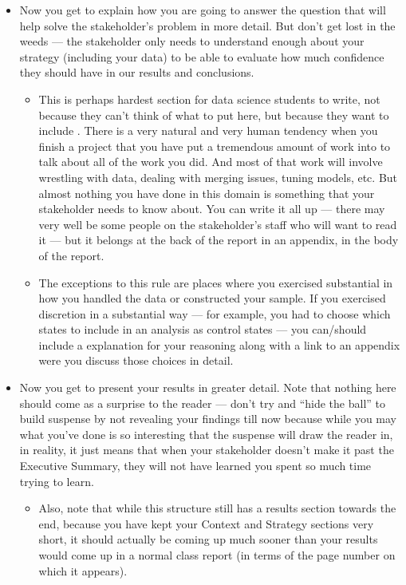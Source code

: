 \documentclass[letterpaper,10pt,english]{jupyterBook}
\begin{document}
\begin{itemize}
\item {} 
\sphinxAtStartPar
{} Now you get to explain how you are going to answer the question that will help solve the stakeholder’s problem in more detail. But don’t get lost in the weeds — the stakeholder only needs to understand enough about your strategy (including your data) to be able to evaluate how much confidence they should have in our results and conclusions.
\begin{itemize}
\item {} 
\sphinxAtStartPar
This is perhaps  hardest section for data science students to write, not because they can’t think of what to put here, but because they want to include . There is a very natural and very human tendency when you finish a project that you have put a tremendous amount of work into to talk about all of the work you did. And most of that work will involve wrestling with data, dealing with merging issues, tuning models, etc. But almost nothing you have done in this domain is something that your stakeholder needs to know about. You can write it all up — there may very well be some people on the stakeholder’s staff who will want to read it — but it belongs at the back of the report in an appendix,  in the body of the report.

\item {} 
\sphinxAtStartPar
The  exceptions to this rule are places where you exercised substantial  in how you handled the data or constructed your sample. If you exercised discretion in a substantial way  — for example, you had to choose which states to include in an analysis as control states — you can/should include a  explanation for your reasoning along with a link to an appendix were you discuss those choices in detail.

\end{itemize}

\item {} 
\sphinxAtStartPar
{} Now you get to present your results in greater detail. Note that nothing here should come as a surprise to the reader — don’t try and “hide the ball” to build suspense by not revealing your findings till now because while you may  what you’ve done is so interesting that the suspense will draw the reader in, in reality, it just means that when your stakeholder doesn’t make it past the Executive Summary, they will not have learned  you spent so much time trying to learn.
\begin{itemize}
\item {} 
\sphinxAtStartPar
Also, note that while this structure still has a results section towards the end, because you have kept your Context and Strategy sections very short, it should actually be coming up much sooner than your results would come up in a normal class report (in terms of the page number on which it appears).


\end{itemize}
\end{itemize}
\end{document}
